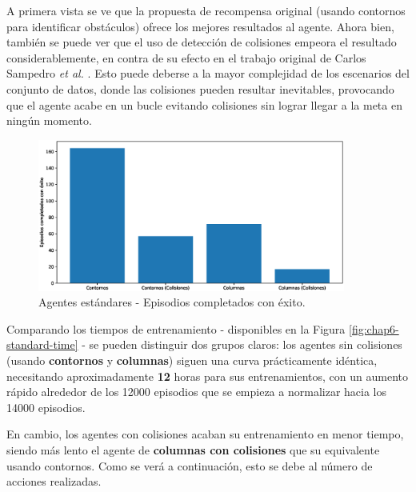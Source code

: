 A primera vista se ve que la propuesta de recompensa original (usando contornos para identificar obstáculos) ofrece los mejores resultados al agente. Ahora bien, también se puede ver que el uso de detección de colisiones empeora el resultado considerablemente, en contra de su efecto en el trabajo original de Carlos Sampedro \textit{et al.} \cite{Sampedro2018}. Esto puede deberse a la mayor complejidad de los escenarios del conjunto de datos, donde las colisiones pueden resultar inevitables, provocando que el agente acabe en un bucle evitando colisiones sin lograr llegar a la meta en ningún momento.

\begin{figure}[H]
    \centering
    \includegraphics[width=0.9\textwidth]{imagenes/cap6/standard/success.eps}
    \caption{Agentes estándares - Episodios completados con éxito.}
    \label{fig:chap6-standard-success}
\end{figure}

Comparando los tiempos de entrenamiento - disponibles en la Figura \ref{fig:chap6-standard-time} - se pueden distinguir dos grupos claros: los agentes sin colisiones (usando \textbf{contornos} y \textbf{columnas}) siguen una curva prácticamente idéntica, necesitando aproximadamente \textbf{12} horas para sus entrenamientos, con un aumento rápido alrededor de los 12000 episodios que se empieza a normalizar hacia los 14000 episodios.

En cambio, los agentes con colisiones acaban su entrenamiento en menor tiempo, siendo más lento el agente de \textbf{columnas con colisiones} que su equivalente usando contornos. Como se verá a continuación, esto se debe al número de acciones realizadas.

